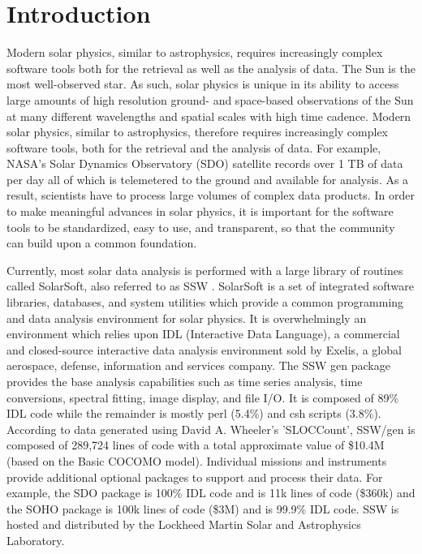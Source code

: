 \section{Introduction}
Modern solar physics, similar to astrophysics, requires increasingly complex 
software tools both for the retrieval as well as the analysis of data. The Sun 
is the most well-observed star. As such, solar physics is unique in its ability 
to access large amounts of high resolution ground- and space-based observations 
of the Sun at many different wavelengths and spatial scales with high time 
cadence. Modern solar physics, similar to astrophysics, therefore requires 
increasingly complex software tools, both for the retrieval and the analysis of 
data. For example, NASA's Solar Dynamics Observatory (SDO) satellite records 
over 1 TB of data per day all of which is telemetered to the ground and 
available for analysis. As a result, scientists have to process large volumes 
of complex data products. In order to make meaningful advances in solar 
physics, it is important for the software tools to be standardized, easy to 
use, and transparent, so that the community can build upon a common foundation.

Currently, most solar data analysis is performed with a large library of 
routines called SolarSoft, also referred to as SSW \cite{ssw_ref}. SolarSoft is a set of integrated software 
libraries, databases, and system utilities which provide a common programming 
and data analysis environment for solar physics. It is overwhelmingly an 
environment which relies upon IDL (Interactive Data Language), a commercial and 
closed-source interactive data analysis environment sold by Exelis, a global 
aerospace, defense, information and services company. The SSW gen package
provides the base analysis capabilities such as time series analysis, time 
conversions, spectral fitting, image display, and file I/O. It is composed of 
89\% IDL code while the remainder is mostly perl (5.4\%) and csh scripts 
(3.8\%). According to data generated using David A. Wheeler's 'SLOCCount', 
SSW/gen is composed of 289,724 lines of code with a total approximate value of 
\$10.4M (based on the Basic COCOMO model). Individual missions and instruments 
provide additional optional packages to support and process their data. 
For example, the SDO package \cite{sdo} is 100\% IDL code and is 11k lines of code (\$360k) 
and the SOHO package \cite{soho} is 100k lines of 
code (\$3M) and is 99.9\% IDL code. SSW is hosted and distributed by the 
Lockheed Martin Solar and Astrophysics Laboratory.

